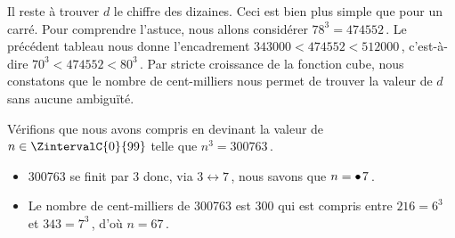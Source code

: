 \begin{method}
    \medskip

    Il reste à trouver $d$ le chiffre des dizaines. Ceci est bien plus simple que pour un carré. Pour comprendre l'astuce, nous allons considérer $78^3 = \num{474552}$\,. Le précédent tableau nous donne l'encadrement $\num{343000}< \num{474552} < \num{512000}$\,, c'est-à-dire $70^3 < \num{474552} < 80^3$\,.
    Par stricte croissance de la fonction cube, nous constatons que le nombre de cent-milliers nous permet de trouver la valeur de $d$ sans aucune ambiguïté.
    
    \medskip

    Vérifions que nous avons compris en devinant la valeur de $n \in \ZintervalC{0}{99}$ telle que $n^3 = \num{300763}$\,.
    
    \begin{itemize}
    	\item \num{300763} se finit par $3$ donc, via $3 \longleftrightarrow 7$\,, nous savons que $n = \bullet\kern1pt7$\,.
	
		\item Le nombre de cent-milliers de \num{300763} est $300$ qui est compris entre $216 = 6^3$ et $343 = 7^3$\,, d'où $n = 67$\,.
    \end{itemize}
\end{method}
